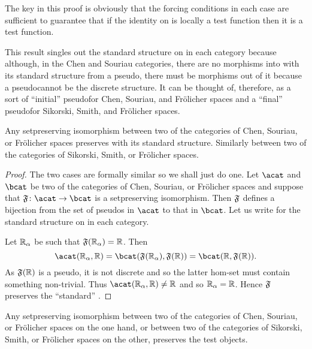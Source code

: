 \documentclass[%
12pt,%
arxiv,%
defaults
]{myclass}
\begin{document}
The key in this proof is obviously that the forcing conditions in each case are sufficient to guarantee that if the identity on \R is locally a test function then it is a test function.

This result singles out the standard structure on \R in each category because although, in the Chen and Souriau categories, there are no morphisms into \R with its standard structure from a pseudo\enhyp{}\R, there must be morphisms out of it because a pseudo\enhyp{}\R cannot be the discrete structure.
It can be thought of, therefore, as a sort of ``initial'' pseudo\enhyp{}\R for Chen, Souriau, and Fr\"olicher spaces and a ``final'' pseudo\enhyp{}\R for Sikorski, Smith, and Fr\"olicher spaces.

\begin{corollary}
Any set\enhyp{}preserving isomorphism between two of the categories of Chen, Souriau, or Fr\"olicher spaces preserves \R with its standard structure.
Similarly between two of the categories of Sikorski, Smith, or Fr\"olicher spaces.
\end{corollary}

\begin{proof}
The two cases are formally similar so we shall just do one.
Let \(\acat\) and \(\bcat\) be two of the categories of Chen, Souriau, or Fr\"olicher spaces and suppose that \(\func{F} \colon \acat \to \bcat\) is a set\enhyp{}preserving isomorphism.
Then \(\func{F}\) defines a bijection from the set of pseudo\enhyp{}\R{}s in \(\acat\) to that in \(\bcat\).
Let us write \R for the standard structure on \R in each category.

Let \(\mathbb{R}_\alpha\) be such that \(\func{F}(\R_\alpha) = \R\).
Then
%
\[
  \Hom{\acat}{\R_\alpha}{\R} = \Hom{\bcat}{\func{F}(\R_\alpha)}{\func{F}(\R)} = \Hom{\bcat}{\R}{\func{F}(\R)}.
\]
%
As \(\func{F}(\R)\) is a pseudo\enhyp{}\R, it is not discrete and so the latter hom\hyp{}set must contain something non\hyp{}trivial.
Thus \(\Hom{\acat}{\R_\alpha}{\R} \ne \R\) and so \(\mathbb{R}_\alpha = \mathbb{R}\).
Hence \(\func{F}\) preserves the ``standard'' \R.
\end{proof}

\begin{corollary}
Any set\enhyp{}preserving isomorphism between two of the categories of Chen, Souriau, or Fr\"olicher spaces on the one hand, or between two of the categories of Sikorski, Smith, or Fr\"olicher spaces on the other, preserves the test objects.
\end{corollary}
\end{document}
